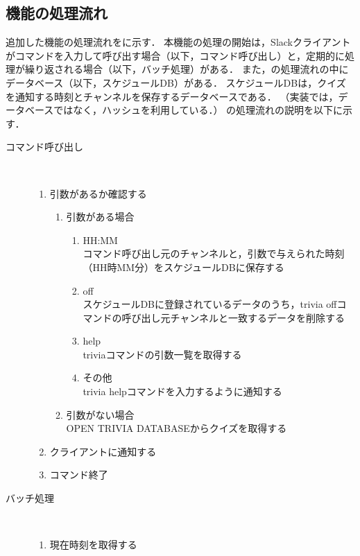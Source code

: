 \documentclass[12pt]{jsarticle}
\begin{document}
\subsection{機能の処理流れ}
追加した機能の処理流れをに示す．
本機能の処理の開始は，Slackクライアントがコマンドを入力して呼び出す場合（以下，コマンド呼び出し）と，定期的に処理が繰り返される場合（以下，バッチ処理）がある．
また，の処理流れの中にデータベース（以下，スケジュールDB）がある．
スケジュールDBは，クイズを通知する時刻とチャンネルを保存するデータベースである．
（実装では，データベースではなく，ハッシュを利用している．）
の処理流れの説明を以下に示す．
\begin{description}
  \item[コマンド呼び出し]~
    \begin{enumerate}
      \item 引数があるか確認する
        \begin{enumerate}
          \item 引数がある場合
            \begin{enumerate}
              \item HH:MM\\
                コマンド呼び出し元のチャンネルと，引数で与えられた時刻（HH時MM分）をスケジュールDBに保存する
              \item off\\
                スケジュールDBに登録されているデータのうち，trivia offコマンドの呼び出し元チャンネルと一致するデータを削除する
              \item help\\
                triviaコマンドの引数一覧を取得する
              \item その他\\
                trivia helpコマンドを入力するように通知する
            \end{enumerate}
          \item 引数がない場合\\
            OPEN TRIVIA DATABASEからクイズを取得する
        \end{enumerate}
      \item クライアントに通知する
      \item コマンド終了\\
    \end{enumerate}
  \item[バッチ処理]~
    \begin{enumerate}
      \item 現在時刻を取得する

\end{enumerate}
\end{description}
\end{document}
